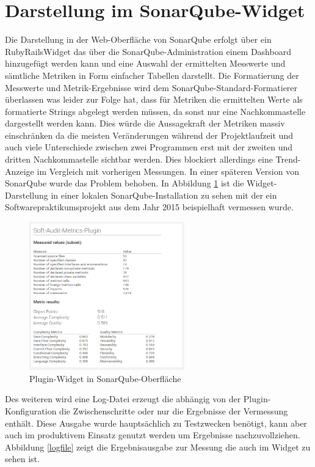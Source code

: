 \documentclass[gb,ngerman]{stthesis}
\begin{document}
		\section{Darstellung im SonarQube-Widget}
			Die Darstellung in der Web-Oberfläche von SonarQube erfolgt über ein RubyRailsWidget das über die SonarQube-Administration einem Dashboard hinzugefügt werden kann und eine Auswahl der ermittelten Messwerte und sämtliche Metriken in Form einfacher Tabellen darstellt. Die Formatierung der Messwerte und Metrik-Ergebnisse wird dem SonarQube-Standard-Formatierer überlassen was leider zur Folge hat, dass für Metriken die ermittelten Werte als formatierte Strings abgelegt werden müssen, da sonst nur eine Nachkommastelle dargestellt werden kann. Dies würde die Aussagekraft der Metriken massiv einschränken da die meisten Veränderungen während der Projektlaufzeit und auch viele Unterschiede zwischen zwei Programmen erst mit der zweiten und dritten Nachkommastelle sichtbar werden. Dies blockiert allerdings eine Trend-Anzeige im Vergleich mit vorherigen Messungen. In einer späteren Version von SonarQube wurde das Problem behoben. In Abbildung \ref{widget} ist die Widget-Darstellung in einer lokalen SonarQube-Installation zu sehen mit der ein Softwarepraktikumsprojekt aus dem Jahr 2015 beispielhaft vermessen wurde.\newline
			\begin{figure} [h]
				\centering
				\includegraphics [width=0.6\textwidth] {widget.png}
				\caption{Plugin-Widget in SonarQube-Oberfläche}
				\label{widget}
			\end{figure}
			Des weiteren wird eine Log-Datei erzeugt die abhängig von der Plugin-Konfiguration die Zwischenschritte oder nur die Ergebnisse der Vermessung enthält. Diese Ausgabe wurde hauptsächlich zu Testzwecken benötigt, kann aber auch im produktivem Einsatz genutzt werden um Ergebnisse nachzuvollziehen. Abbildung \ref{logfile} zeigt die Ergebnisausgabe zur Messung die auch im Widget zu sehen ist.
\end{document}
